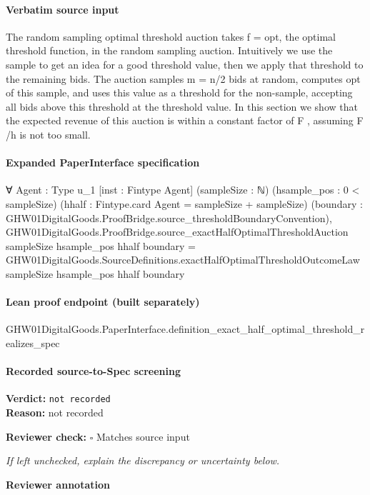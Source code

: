 \documentclass[10pt]{article}
\newcommand{\reviewerbox}{%
  \par\noindent\fbox{\parbox{0.96\linewidth}{\rule{0pt}{0.38in}}}\par
}
\newcommand{\reviewmatch}[1]{%
  \par\noindent\textbf{Reviewer check:} $\square$\; #1\par
  \noindent\emph{If left unchecked, explain the discrepancy or uncertainty below.}\par
}
\begin{document}
\paragraph{Verbatim source input}
\begin{ReviewVerbatim}
The random sampling optimal threshold auction
takes f = opt, the optimal threshold function, in
the random sampling auction. Intuitively we use the
sample to get an idea for a good threshold value,
then we apply that threshold to the remaining bids.
The auction samples m = n/2 bids at random, computes opt of this sample, and uses this value as a
threshold for the non-sample, accepting all bids above
this threshold at the threshold value. In this section
we show that the expected revenue of this auction is
within a constant factor of F , assuming F /h is not
too small.
\end{ReviewVerbatim}


\paragraph{Expanded PaperInterface specification}
\begin{ReviewVerbatim}
∀ {Agent : Type u_1} [inst : Fintype Agent] (sampleSize : ℕ) (hsample_pos : 0 < sampleSize)
  (hhalf : Fintype.card Agent = sampleSize + sampleSize)
  (boundary : GHW01DigitalGoods.ProofBridge.source_thresholdBoundaryConvention),
  GHW01DigitalGoods.ProofBridge.source_exactHalfOptimalThresholdAuction sampleSize hsample_pos hhalf boundary =
    GHW01DigitalGoods.SourceDefinitions.exactHalfOptimalThresholdOutcomeLaw sampleSize hsample_pos hhalf boundary
\end{ReviewVerbatim}

\paragraph{Lean proof endpoint (built separately)}\begin{ReviewVerbatim}
GHW01DigitalGoods.PaperInterface.definition_exact_half_optimal_threshold_realizes_spec
\end{ReviewVerbatim}

\paragraph{Recorded source-to-Spec screening}
\textbf{Verdict:} \texttt{not recorded}
\\
\textbf{Reason:} not recorded
\reviewmatch{Matches source input}
\noindent\textbf{Reviewer annotation}\par
\reviewerbox
\clearpage
\hypertarget{source-claim-f58496f241e6c6f1}{}
\end{document}
